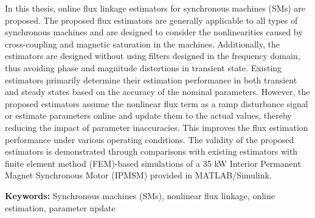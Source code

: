 In this thesis, online flux linkage estimators for synchronous machines (SMs) are proposed. The proposed flux estimators are generally applicable to all types of synchronous machines and are designed to consider the nonlinearities caused by cross-coupling and magnetic saturation in the machines. Additionally, the estimators are designed without using filters designed in the frequency domain, thus avoiding phase and magnitude distortions in transient state. Existing estimators primarily determine their estimation performance in both transient and steady states based on the accuracy of the nominal parameters. However, the proposed estimators assume the nonlinear flux term as a ramp disturbance signal or estimate parameters online and update them to the actual values, thereby reducing the impact of parameter inaccuracies. This improves the flux estimation performance under various operating conditions. The validity of the proposed estimators is demonstrated through
comparisons with existing estimators with finite element method (FEM)-based simulations of a 35 kW Interior Permanent Magnet Synchronous Motor (IPMSM) provided
in MATLAB/Simulink.

\textbf{Keywords:} Synchronous machines (SMs), nonlinear flux linkage, online estimation, parameter update 